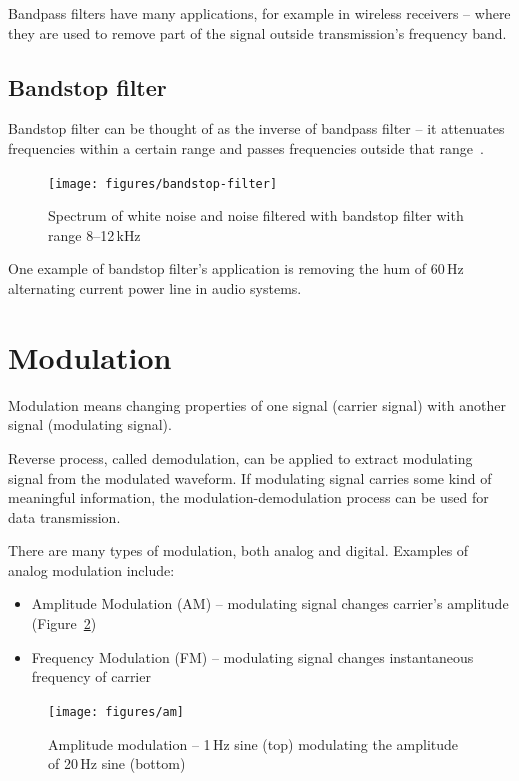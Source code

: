 \documentclass[english,bachelor,a4paper,oneside]{ppfcmthesis}
\begin{document}
Bandpass filters have many applications, for example in wireless receivers -- where they are used to remove part of the signal outside transmission's frequency band.

\subsection{Bandstop filter}

Bandstop filter can be thought of as the inverse of bandpass filter -- it attenuates frequencies within a certain range and passes frequencies outside that range~\cite{JOSFilters}.

\begin{figure}[h]
  \centering
  \texttt{[image: figures/bandstop-filter]}
  \caption[Effect of a bandstop filter]{Spectrum of white noise and noise filtered with bandstop filter with range 8--12\,kHz}
  \label{fig:bandstop}
\end{figure}

One example of bandstop filter's application is removing the hum of 60\,Hz alternating current power line in audio systems.

\section{Modulation}

Modulation means changing properties of one signal (carrier signal) with another signal (modulating signal).

Reverse process, called demodulation, can be applied to extract modulating signal from the modulated waveform.
If modulating signal carries some kind of meaningful information, the modulation-demodulation process can be used for data transmission.

There are many types of modulation, both analog and digital. Examples of analog modulation include:

\begin{itemize}
\item Amplitude Modulation (AM) -- modulating signal changes carrier's amplitude (Figure~\ref{fig:am})
\item Frequency Modulation (FM) -- modulating signal changes instantaneous frequency of carrier
\end{itemize}

\begin{figure}[h]
  \centering
  \texttt{[image: figures/am]}
  \caption[Amplitude modulation]{Amplitude modulation -- 1\,Hz sine (top) modulating the amplitude of 20\,Hz sine (bottom)}
  \label{fig:am}
\end{figure}
\end{document}
